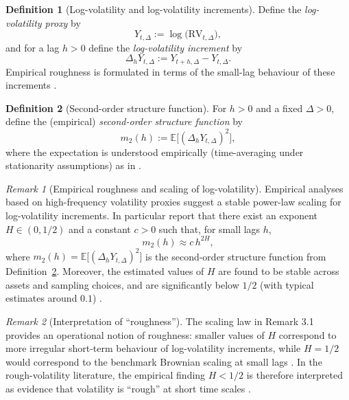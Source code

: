 \documentclass[12pt,a4paper]{article}
\theoremstyle{definition}
\newtheorem{definition}{Definition}[section]
\theoremstyle{plain}
\theoremstyle{remark}
\newtheorem{remark}{Remark}[section]
\theoremstyle{plain}
\begin{document}
\begin{definition}[Log-volatility and log-volatility increments]
\label{def:log_vol_increments}
Define the \emph{log-volatility proxy} by
\[
Y_{t,\Delta}:=\log\!\bigl(\mathrm{RV}_{t,\Delta}\bigr),
\]
and for a lag $h>0$ define the \emph{log-volatility increment} by
\[
\Delta_h Y_{t,\Delta}
:=
Y_{t+h,\Delta}-Y_{t,\Delta}.
\]
Empirical roughness is formulated in terms of the small-lag behaviour of these increments \cite{GatheralRough}.
\end{definition}

\begin{definition}[Second-order structure function]
\label{def:structure_function}
For $h>0$ and a fixed $\Delta>0$, define the (empirical) \emph{second-order structure function} by
\[
m_2(h)
:=
\mathbb{E}\bigl[(\Delta_h Y_{t,\Delta})^2\bigr],
\]
where the expectation is understood empirically (time-averaging under stationarity assumptions) as in \cite{GatheralRough}.
\end{definition}

\begin{remark}[Empirical roughness and scaling of log-volatility]
\label{rem:empirical_roughness_scaling}
Empirical analyses based on high-frequency volatility proxies suggest a stable power-law scaling for log-volatility increments.
In particular \cite{GatheralRough} report that there exist an exponent $H\in(0,1/2)$ and a constant $c>0$ such that, for small lags $h$,
\[
m_2(h)\approx c\,h^{2H},
\]
where $m_2(h)=\mathbb{E}\bigl[(\Delta_h Y_{t,\Delta})^2\bigr]$ is the second-order structure function from Definition~\ref{def:structure_function}.
Moreover, the estimated values of $H$ are found to be stable across assets and sampling choices, and are significantly below $1/2$ (with typical estimates around $0.1$) \cite{GatheralRough}.
\end{remark}

\begin{remark}[Interpretation of ``roughness'']
\label{rem:roughness_interpretation}
The scaling law in Remark 3.1 provides an operational notion of roughness: smaller values of $H$ correspond to more irregular short-term behaviour of log-volatility increments, while $H=1/2$ would correspond to the benchmark Brownian scaling at small lags \cite{GatheralRough}.
In the rough-volatility literature, the empirical finding $H<1/2$ is therefore interpreted as evidence that volatility is ``rough'' at short time scales \cite{GatheralRough}.
\end{remark}
\end{document}
